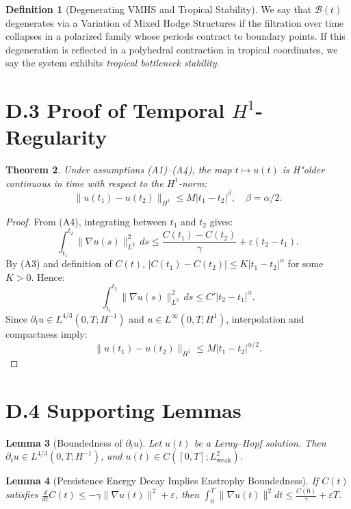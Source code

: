 \documentclass[11pt]{article}
\newtheorem{theorem}{Theorem}[section]
\newtheorem{lemma}[theorem]{Lemma}
\theoremstyle{definition}
\newtheorem{definition}[theorem]{Definition}
\begin{document}
\begin{definition}[Degenerating VMHS and Tropical Stability]
We say that $\mathcal{B}(t)$ degenerates via a Variation of Mixed Hodge Structures if the filtration over time collapses in a polarized family whose periods contract to boundary points. If this degeneration is reflected in a polyhedral contraction in tropical coordinates, we say the system exhibits \emph{tropical bottleneck stability}.
\end{definition}

\section*{D.3 Proof of Temporal $H^1$-Regularity}
\begin{theorem}
Under assumptions (A1)--(A4), the map $t \mapsto u(t)$ is H"older continuous in time with respect to the $H^1$-norm:
\[
\|u(t_1) - u(t_2)\|_{H^1} \leq M |t_1 - t_2|^\beta, \quad \beta = \alpha/2.
\]
\end{theorem}

\begin{proof}
From (A4), integrating between $t_1$ and $t_2$ gives:
\[
\int_{t_1}^{t_2} \|\nabla u(s)\|_{L^2}^2 \, ds \leq \frac{C(t_1) - C(t_2)}{\gamma} + \varepsilon (t_2 - t_1).
\]
By (A3) and definition of $C(t)$, $|C(t_1) - C(t_2)| \leq K |t_1 - t_2|^\alpha$ for some $K > 0$.
Hence:
\[
\int_{t_1}^{t_2} \|\nabla u(s)\|_{L^2}^2 \, ds \leq C' |t_2 - t_1|^\alpha.
\]
Since $\partial_t u \in L^{4/3}(0,T;H^{-1})$ and $u \in L^\infty(0,T;H^1)$, interpolation and compactness imply:
\[
\|u(t_1) - u(t_2)\|_{H^1} \leq M |t_1 - t_2|^{\alpha/2}.
\]
\end{proof}

\section*{D.4 Supporting Lemmas}
\begin{lemma}[Boundedness of $\partial_t u$]
Let $u(t)$ be a Leray--Hopf solution. Then $\partial_t u \in L^{4/3}(0,T; H^{-1})$, and $u(t) \in C([0,T]; L^2_{\text{weak}})$.
\end{lemma}

\begin{lemma}[Persistence Energy Decay Implies Enstrophy Boundedness]
If $C(t)$ satisfies $\frac{d}{dt} C(t) \leq -\gamma \|\nabla u(t)\|^2 + \varepsilon$, then $\int_0^T \|\nabla u(t)\|^2 dt \leq \frac{C(0)}{\gamma} + \varepsilon T$.
\end{lemma}
\end{document}
